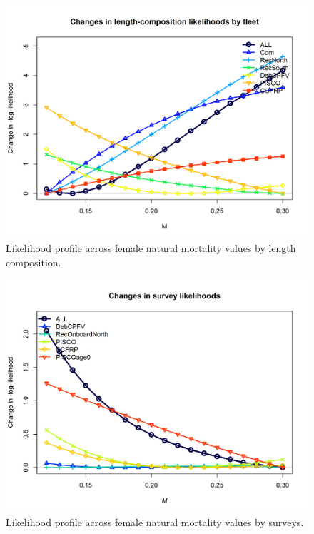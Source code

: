 \documentclass[12pt,]{article}
\begin{document}
\FloatBarrier

\begin{figure}
\centering
\includegraphics{Figures/profile_m_piner.png}
\caption{Likelihood profile across female natural mortality values by
length composition. \label{fig:profile_m_piner}}
\end{figure}

\FloatBarrier 

\begin{figure}
\centering
\includegraphics{Figures/profile_m_piner2.png}
\caption{Likelihood profile across female natural mortality values by
surveys. \label{fig:profile_m_piner2}}
\end{figure}
\end{document}
